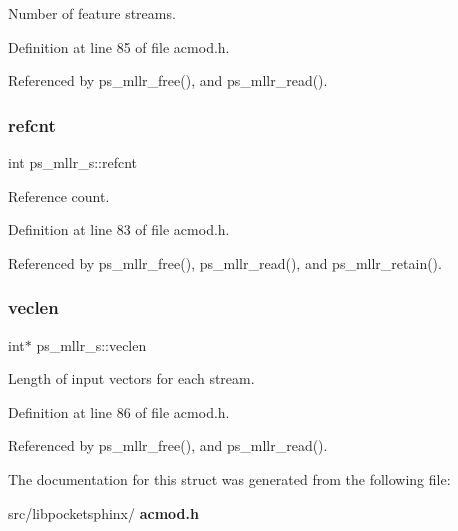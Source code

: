 Number of feature streams. 



Definition at line 85 of file acmod.\+h.



Referenced by ps\+\_\+mllr\+\_\+free(), and ps\+\_\+mllr\+\_\+read().

\mbox{\label{structps__mllr__s_ac138bd81a40d8569d795463ea1ec52bd}} 
\subsubsection{refcnt}
{\footnotesize\ttfamily int ps\+\_\+mllr\+\_\+s\+::refcnt}



Reference count. 



Definition at line 83 of file acmod.\+h.



Referenced by ps\+\_\+mllr\+\_\+free(), ps\+\_\+mllr\+\_\+read(), and ps\+\_\+mllr\+\_\+retain().

\mbox{\label{structps__mllr__s_a20fae2fc119069371464a6502e00c0e4}} 
\subsubsection{veclen}
{\footnotesize\ttfamily int$\ast$ ps\+\_\+mllr\+\_\+s\+::veclen}



Length of input vectors for each stream. 



Definition at line 86 of file acmod.\+h.



Referenced by ps\+\_\+mllr\+\_\+free(), and ps\+\_\+mllr\+\_\+read().



The documentation for this struct was generated from the following file\+:\begin{DoxyCompactItemize}
\item 
src/libpocketsphinx/\textbf{ acmod.\+h}\end{DoxyCompactItemize}
